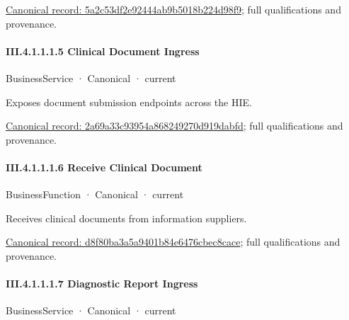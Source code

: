 {\footnotesize \href{../../../../../../../../continuum/business/business-function/5a2c53df2e92444ab9b5018b224d98f9.md}{Canonical record: 5a2c53df2e92444ab9b5018b224d98f9}; full qualifications and provenance.}\par
\paragraph*{III.4.1.1.1.5 Clinical Document Ingress}
\label{navigation:III.4.1.1.1.5}

\label{element:2a69a33c93954a868249270d919dabfd}
{\small BusinessService · Canonical · current}\par

Exposes document submission endpoints across the HIE.


{\footnotesize \href{../../../../../../../../continuum/business/business-service/2a69a33c93954a868249270d919dabfd.md}{Canonical record: 2a69a33c93954a868249270d919dabfd}; full qualifications and provenance.}\par
\paragraph*{III.4.1.1.1.6 Receive Clinical Document}
\label{navigation:III.4.1.1.1.6}

\label{element:d8f80ba3a5a9401b84e6476cbec8cace}
{\small BusinessFunction · Canonical · current}\par

Receives clinical documents from information suppliers.


{\footnotesize \href{../../../../../../../../continuum/business/business-function/d8f80ba3a5a9401b84e6476cbec8cace.md}{Canonical record: d8f80ba3a5a9401b84e6476cbec8cace}; full qualifications and provenance.}\par
\paragraph*{III.4.1.1.1.7 Diagnostic Report Ingress}
\label{navigation:III.4.1.1.1.7}

\label{element:b151ad42b9194d9e84b1dd9beecdf6dd}
{\small BusinessService · Canonical · current}\par

